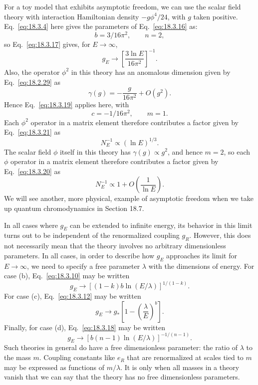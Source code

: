 For a toy model that exhibits asymptotic freedom, we can use the scalar
field theory with interaction Hamiltonian density $-g\phi^4/24$, with $g$ taken
positive. Eq.\ \eqref{eq:18.3.4} here gives the parameters of Eq.\ \eqref{eq:18.3.16} as:
\begin{equation}
b=3/16\pi^2,\qquad n=2,
\label{eq:18.3.22}
\end{equation}
so Eq.\ \eqref{eq:18.3.17} gives, for $E\to\infty$,
\begin{equation}
g_E\to\left[\frac{3\ln E}{16\pi^2}\right]^{-1}.
\label{eq:18.3.23}
\end{equation}
Also, the operator $\phi^2$ in this theory has an anomalous dimension given
by Eq.\ \eqref{eq:18.2.29} as
\begin{equation}
\gamma(g)=-\frac{g}{16\pi^2}+O(g^2).
\label{eq:18.3.24}
\end{equation}
Hence Eq.\ \eqref{eq:18.3.19} applies here, with
\begin{equation}
c=-1/16\pi^2,\qquad m=1.
\label{eq:18.3.25}
\end{equation}
Each $\phi^2$ operator in a matrix element therefore contributes a factor given
by Eq.\ \eqref{eq:18.3.21} as
\begin{equation}
N_E^{-1}\propto(\ln E)^{1/3}.
\label{eq:18.3.26}
\end{equation}
The scalar field $\phi$ itself in this theory has $\gamma(g)\propto g^2$, and hence $m=2$, so
each $\phi$ operator in a matrix element therefore contributes a factor given
by Eq.\ \eqref{eq:18.3.20} as
\begin{equation}
N_E^{-1}\propto1+O\left(\frac{1}{\ln E}\right).
\label{eq:18.3.27}
\end{equation}
We will see another, more physical, example of asymptotic freedom when
we take up quantum chromodynamics in Section 18.7.

In all cases where $g_E$ can be extended to infinite energy, its behavior
in this limit turns out to be independent of the renormalized coupling
$g_R$. However, this does not necessarily mean that the theory involves no
arbitrary dimensionless parameters. In all cases, in order to describe how
$g_E$ approaches its limit for $E\to\infty$, we need to specify a free parameter $\lambda$
with the dimensions of energy. For case (b), Eq.\ \eqref{eq:18.3.10} may be written
\[
g_E\to[(1-k)b\ln(E/\lambda)]^{1/(1-k)}.
\]
For case (c), Eq.\ \eqref{eq:18.3.12} may be written
\[
g_E\to g_*\left[1-\left(\frac{\lambda}{E}\right)^b\right].
\]
Finally, for case (d), Eq.\ \eqref{eq:18.3.18} may be written
\[
g_E\to[b(n-1)\ln(E/\lambda)]^{-1/(n-1)}.
\]
Such theories in general do have a free dimensionless parameter: the ratio
of $\lambda$ to the mass $m$. Coupling constants like $e_R$ that are renormalized at
scales tied to $m$ may be expressed as functions of $m/\lambda$. It is only when
all masses in a theory vanish that we can say that the theory has no free
dimensionless parameters.

